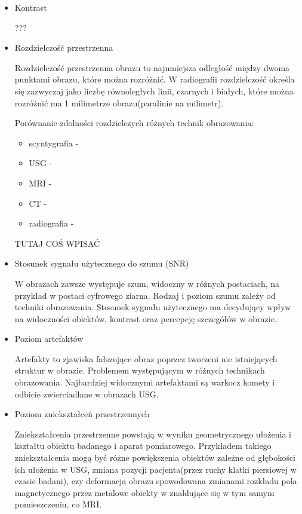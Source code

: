 \begin{itemize}
    \item Kontrast
    
    ???

    \item Rozdzielczość przestrzenna

    Rozdzielczość przestrzenna obrazu to najmniejsza odległość między dwoma punktami obrazu, które można rozróżnić.
    W radiografii rozdzielczość określa się zazwyczaj jako liczbę równoległych linii, czarnych i białych, które można rozróżnić ma 1 milimetrze obrazu(paralinie na milimetr).

    Porównanie zdolności rozdzielczych różnych technik obrazowania:
    \begin{itemize}
        \item scyntygrafia - 
        \item USG - 
        \item MRI -
        \item CT -
        \item radiografia -
    \end{itemize}
    TUTAJ COŚ WPISAĆ

    \item Stosunek sygnału użytecznego do szumu (SNR)

    W obrazach zawsze występuje szum, widoczny w różnych postaciach, na przykład w postaci cyfrowego ziarna.
    Rodzaj i poziom szumu zależy od techniki obrazowania.
    Stosunek sygnału użytecznego ma decydujący wpływ na widoczności obiektów, kontrast oraz percepcję szczegółów w obrazie.

    \item Poziom artefaktów
    
    Artefakty to zjawiska fałszujące obraz poprzez tworzeni nie istniejących struktur w obrazie.
    Problemem występującym w różnych technikach obrazowania.
    Najbardziej widocznymi artefaktami są warkocz komety i odbicie zwierciadlane w obrazach USG.

    \item Poziom zniekształceń przestrzennych
    
    Zniekształcenia przestrzenne powstają w wyniku geometrycznego ułożenia i kształtu obiektu badanego i aparat pomiarowego.
    Przykładem takiego zniekształcenia mogą być różne powiększenia obiektów zależne od głębokości ich ułożenia w USG, zmiana pozycji pacjenta(przez ruchy klatki piersiowej w czasie badani), czy deformacja obrazu spowodowana zmianami rozkładu pola magnetycznego przez metalowe obiekty w znaldujące się w tym samym pomieszczeniu, co MRI.

\end{itemize}

